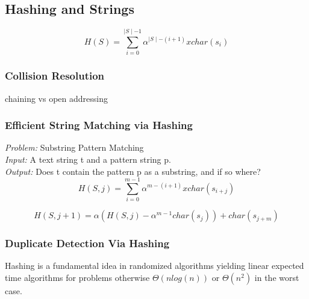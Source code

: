 \subsection{Hashing and Strings}

$$H(S) = \sum_{i=0}^{\mid S \mid - 1}\alpha^{\mid S \mid - (i+1)} x char(s_{i})$$

\subsubsection{Collision Resolution}
chaining vs open addressing \\

\subsubsection{Efficient String Matching via Hashing}

\emph{Problem:} Substring Pattern Matching \\
\emph{Input:} A text string t and a pattern string p. \\
\emph{Output:} Does t contain the pattern p as a substring, and if so where?\\


$$H(S, j) = \sum_{i=0}^{m - 1}\alpha^{m - (i+1)} x char(s_{i+j})$$

$$H(S, j+1) = \alpha(H(S,j) - \alpha^{m-1}char(s_{j})) + char(s_{j+m})$$

\subsubsection{Duplicate Detection Via Hashing}

Hashing is a fundamental idea in randomized algorithms yielding linear expected time algorithms for problems otherwise $\Theta(nlog(n))$ or $\Theta(n^{2})$ in the worst case. \\